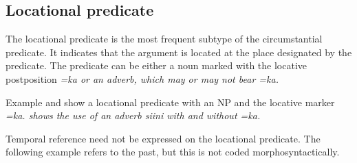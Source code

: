 \subsection{Locational predicate}\label{sec:pred:Locationalpredicate}
The locational predicate is the most frequent subtype of the circumstantial predicate. It indicates that the argument is located at the place designated by the predicate. The predicate can be either  a noun marked with the locative postposition \em =ka \em or an adverb, which may or may not bear \em =ka\em.



Example   and  show a locational predicate with an NP and the locative marker \em =ka\em.   shows the use of an adverb \em siini \em with and without \em =ka\em.









Temporal reference need not be expressed on the locational predicate. The following example refers to the past, but this is not coded morphosyntactically.


